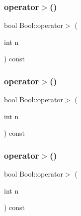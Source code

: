 \mbox{\label{struct_bool_a7baecbc58992eb06157fbbbaa560be0b}} 
\subsubsection{\texorpdfstring{operator$>$()}{operator>()}\hspace{0.1cm}{\footnotesize\ttfamily [1/3]}}
{\footnotesize\ttfamily bool Bool\+::operator$>$ (\begin{DoxyParamCaption}\item[{int}]{n }\end{DoxyParamCaption}) const\hspace{0.3cm}{\ttfamily [inline]}}

\mbox{\label{struct_bool_a7baecbc58992eb06157fbbbaa560be0b}} 
\subsubsection{\texorpdfstring{operator$>$()}{operator>()}\hspace{0.1cm}{\footnotesize\ttfamily [2/3]}}
{\footnotesize\ttfamily bool Bool\+::operator$>$ (\begin{DoxyParamCaption}\item[{int}]{n }\end{DoxyParamCaption}) const\hspace{0.3cm}{\ttfamily [inline]}}

\mbox{\label{struct_bool_a7baecbc58992eb06157fbbbaa560be0b}} 
\subsubsection{\texorpdfstring{operator$>$()}{operator>()}\hspace{0.1cm}{\footnotesize\ttfamily [3/3]}}
{\footnotesize\ttfamily bool Bool\+::operator$>$ (\begin{DoxyParamCaption}\item[{int}]{n }\end{DoxyParamCaption}) const\hspace{0.3cm}{\ttfamily [inline]}}



